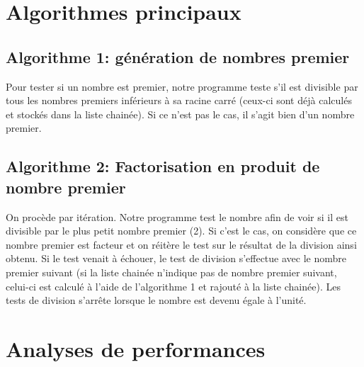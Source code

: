 \documentclass[11pt,a4paper]{article}
\begin{document}
\section*{Algorithmes principaux}
 \subsection*{Algorithme 1: génération de nombres premier}
 
Pour tester si un nombre est premier, notre programme teste s'il est divisible par tous les nombres premiers inférieurs à sa racine carré (ceux-ci sont déjà calculés et stockés dans la liste chainée). Si ce n'est pas le cas, il s'agit bien d'un nombre premier. 
 
 
 \subsection*{Algorithme 2: Factorisation en produit de nombre premier}   
 
 On procède par itération. Notre programme test le nombre afin de voir si il est divisible par le plus petit nombre premier (2). Si c'est le cas, on considère que ce nombre premier est facteur et on réitère le test sur le résultat de la division ainsi obtenu. Si le test venait à échouer, le test de division s'effectue avec le nombre premier suivant (si la liste chainée n'indique pas de nombre premier suivant, celui-ci est calculé à l'aide de l'algorithme 1 et rajouté à la liste chainée). Les tests de division s'arrête lorsque le nombre est devenu égale à l'unité.
 
\section*{Analyses de performances}
\end{document}
